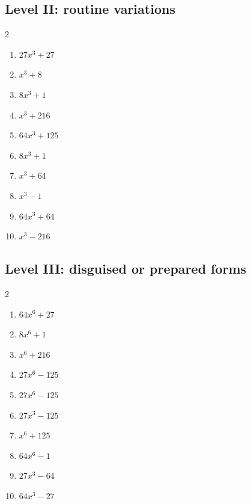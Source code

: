 \documentclass[11pt,oneside]{book}
\begin{document}
\subsection*{Level II: routine variations}
\begin{multicols}{2}
\begin{enumerate}[leftmargin=*,label=\textbf{\arabic*.},itemsep=0.65\baselineskip]
\item $ 27 x^{3} + 27 $
\item $ x^{3} + 8 $
\item $ 8 x^{3} + 1 $
\item $ x^{3} + 216 $
\item $ 64 x^{3} + 125 $
\item $ 8 x^{3} + 1 $
\item $ x^{3} + 64 $
\item $ x^{3} - 1 $
\item $ 64 x^{3} + 64 $
\item $ x^{3} - 216 $
\end{enumerate}
\end{multicols}
\subsection*{Level III: disguised or prepared forms}
\begin{multicols}{2}
\begin{enumerate}[leftmargin=*,label=\textbf{\arabic*.},itemsep=0.65\baselineskip]
\item $ 64 x^{6} + 27 $
\item $ 8 x^{6} + 1 $
\item $ x^{6} + 216 $
\item $ 27 x^{6} - 125 $
\item $ 27 x^{6} - 125 $
\item $ 27 x^{3} - 125 $
\item $ x^{6} + 125 $
\item $ 64 x^{6} - 1 $
\item $ 27 x^{3} - 64 $
\item $ 64 x^{3} - 27 $
\end{enumerate}
\end{multicols}
\end{document}
